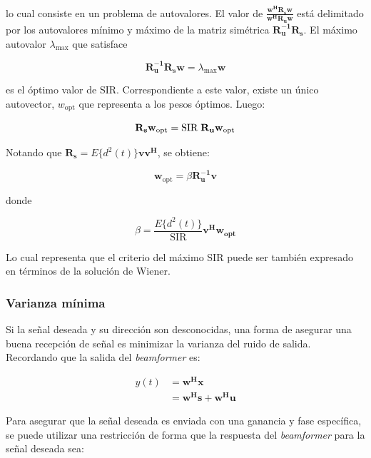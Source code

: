 lo cual consiste en un problema de autovalores. El valor de $\frac{\mathbf{w^H R_s w}}{\mathbf{w^H R_u w}}$ está delimitado por los autovalores mínimo y máximo de la matriz simétrica $\mathbf{R_u^{-1} R_s}$. El máximo autovalor $\lambda_{\text{max}}$ que satisface

\begin{equation}
\mathbf{R_u^{-1} R_s w} = \lambda_{\text{max}} \mathbf{w}
\end{equation}

es el óptimo valor de SIR. Correspondiente a este valor, existe un único autovector, $w_{\text{opt}}$ que representa a los pesos óptimos. Luego:

\begin{equation}
\mathbf{R_s w_{\text{opt}}} = \text{SIR} \hspace{1mm} \mathbf{R_u w_{\text{opt}}}
\end{equation}

Notando que $\mathbf{R_s} = E\{d^2(t)\} \mathbf{v v^H}$, se obtiene:

\begin{equation}
\mathbf{w}_{\text{opt}} = \beta \mathbf{R_u^{-1}v}
\end{equation}

donde

\begin{equation}
\beta = \frac{E\{d^2(t)\}}{\text{SIR}} \mathbf{v^H w_\text{opt}}
\end{equation}

Lo cual representa que el criterio del máximo SIR puede ser también expresado en términos de la solución de Wiener.

\subsubsection{Varianza mínima}

Si la señal deseada y su dirección son desconocidas, una forma de asegurar una buena recepción de señal es minimizar la varianza del ruido de salida. Recordando que la salida del \textit{beamformer} es:

\begin{align}
y(t) &=  \mathbf{w^H x} \\
     &=  \mathbf{w^H s + w^H u} \nonumber
\end{align}

Para asegurar que la señal deseada es enviada con una ganancia y fase específica, se puede utilizar una restricción de forma que la respuesta del \textit{beamformer} para la señal deseada sea:

